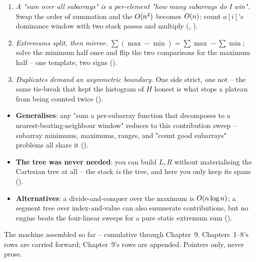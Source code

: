 \begin{insightbox}
\begin{enumerate}[nosep, leftmargin=1.6em]
  \item \emph{A "sum over all subarrays" is a per-element "how many subarrays do I win".} Swap the order of
        summation and the $O(n^2)$ becomes $O(n)$: count $a[i]$'s dominance window with two stack
        passes and multiply (, ).
  \item \emph{Extremums split, then mirror.} $\sum(\max-\min)=\sum\max-\sum\min$; solve the minimum half once
        and flip the two comparisons for the maximum half -- one template, two signs ().
  \item \emph{Duplicates demand an asymmetric boundary.} One side strict, one not -- the same tie-break that
        kept the histogram of $H$ honest is what stops a plateau from being counted twice ().
\end{enumerate}
\end{insightbox}

\begin{hardeningbox}
\begin{itemize}[nosep, leftmargin=1.4em]
  \item \textbf{Generalises}: any "sum a per-subarray function that decomposes to a nearest-beating-neighbour
        window" reduces to this contribution sweep -- subarray minimums, maximums, ranges, and "count good
        subarrays" problems all share it ().
  \item \textbf{The tree was never needed}: you can build $L,R$ without materialising the Cartesian tree at
        all -- the stack \emph{is} the tree, and here you only keep its spans ().
  \item \textbf{Alternatives}: a divide-and-conquer over the maximum is $O(n\log n)$; a segment tree
        over index-and-value can also enumerate contributions, but no engine beats the four-linear sweeps
        for a pure static extremum sum ().
\end{itemize}
\end{hardeningbox}


The machine assembled so far -- cumulative through Chapter~9. Chapters~1--8's rows are carried
forward; Chapter~9's rows are appended. Pointers only, never prose.

